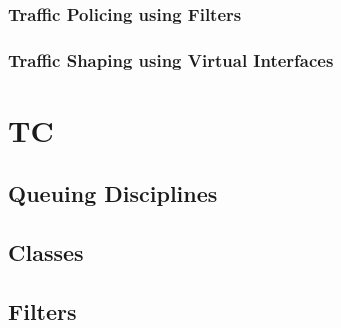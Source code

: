 \subsubsection{Traffic Policing using Filters}
\subsubsection{Traffic Shaping using Virtual Interfaces}
\section{TC} \label{TC}
\subsection{Queuing Disciplines}
\subsection{Classes}
\subsection{Filters}